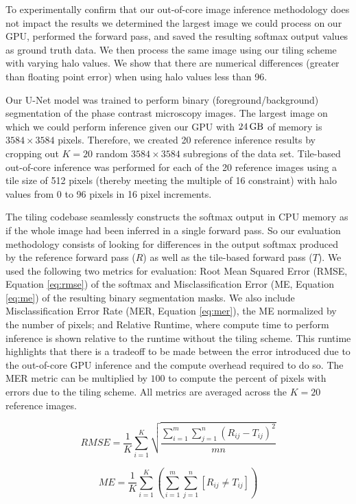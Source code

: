 \documentclass[10pt, indentfirst]{article}
\begin{document}
To experimentally confirm that our out-of-core image inference methodology does not impact the results we determined the largest image we could process on our GPU, performed the forward pass, and saved the resulting softmax output values as ground truth data.
We then process the same image using our tiling scheme with varying halo values.
We show that there are numerical differences (greater than floating point error) when using halo values less than 96.

Our U-Net model was trained to perform binary (foreground/background) segmentation of the phase contrast microscopy images.
The largest image on which we could perform inference given our GPU with $\SI{24}{\giga\byte}$ of memory is $3584 \times 3584$ pixels.
Therefore, we created 20 reference inference results by cropping out $K = 20$ random $3584 \times 3584$ subregions of the data set.
Tile-based out-of-core inference was performed for each of the 20 reference images using a tile size of 512 pixels (thereby meeting the multiple of 16 constraint) with halo values from 0 to 96 pixels in 16 pixel increments.

The tiling codebase seamlessly constructs the softmax output in CPU memory as if the whole image had been inferred in a single forward pass.
So our evaluation methodology consists of looking for differences in the output softmax produced by the reference forward pass ($R$) as well as the tile-based forward pass ($T$).
We used the following two metrics for evaluation: Root Mean Squared Error (RMSE, Equation \ref{eq:rmse}) of the softmax and Misclassification Error (ME, Equation \ref{eq:me}) of the resulting binary segmentation masks.
We also include Misclassification Error Rate (MER, Equation \ref{eq:mer}), the ME normalized by the number of pixels; and Relative Runtime, where compute time to perform inference is shown relative to the runtime without the tiling scheme.
This runtime highlights that there is a tradeoff to be made between the error introduced due to the out-of-core GPU inference and the compute overhead required to do so.
The MER metric can be multiplied by $100$ to compute the percent of pixels with errors due to the tiling scheme.
All metrics are averaged across the $K = 20$ reference images.

\begin{equation}
RMSE = \frac{1}{K} \sum_{i=1}^{K} \sqrt{ \frac{\sum_{i = 1}^{m} \sum_{j = 1}^{n} (R_{ij} - T_{ij})^2}{mn}}
\label{eq:rmse}
\end{equation}

\begin{equation}
ME = \frac{1}{K} \sum_{i=1}^{K} \left( \sum_{i = 1}^{m} \sum_{j = 1}^{n} [ R_{ij} \neq T_{ij} ] \right) 
\label{eq:me}
\end{equation}
\end{document}
